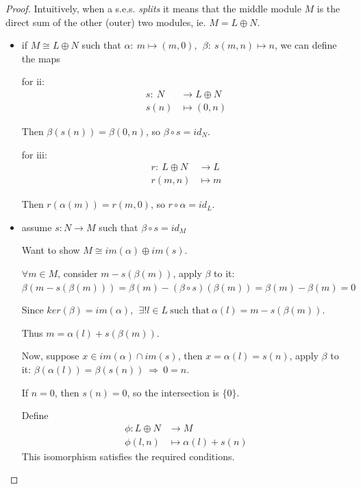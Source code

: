 \documentclass{article}
\theoremstyle{definition}
\begin{document}
\begin{proof}
  Intuitively, when a s.e.s. \emph{splits} it means that the middle module $M$ is the direct sum of the other (outer) two modules, ie. $M = L \oplus N$.

  \begin{itemize}
    \item[(i to ii, iii)]
      if $M \cong L \oplus N$ such that $\alpha:~ m \longmapsto (m,0),~~ \beta:~ s(m, n) \longmapsto n$, we can define the maps

      for ii:
      \begin{align*}
        s:~ N &\longrightarrow L \oplus N\\
        s(n) &\longmapsto (0, n)
      \end{align*}

      Then $\beta(s(n))=\beta(0,n)$, so $\beta \circ s = id_N$.

      for iii:
      \begin{align*}
        r:~ L \oplus N &\longrightarrow L\\
        r(m,n) &\longmapsto m
      \end{align*}

      Then $r(\alpha(m))=r(m,0)$, so $r \circ \alpha = id_L$.

    \item[(ii to i)]
      assume $s: N \longrightarrow M$ such that $\beta \circ s = id_M$

      Want to show $M \cong im(\alpha) \oplus im(s)$.

      $\forall m \in M$, consider $m - s(\beta(m))$, apply $\beta$ to it:\\
      $\beta(m - s(\beta(m))) = \beta(m) - (\beta \circ s)(\beta(m)) = \beta(m) - \beta(m) = 0$

      Since $ker(\beta) = im(\alpha),~~ \exists! l \in L ~\text{such that}~ \alpha(l) = m - s(\beta(m))$.

      Thus $m = \alpha(l) + s(\beta(m))$.

      \vspace{0.3cm}
      Now, suppose $x \in im(\alpha) \cap im(s)$, then $x = \alpha(l)=s(n)$, apply $\beta$ to it: $\beta(\alpha(l)) = \beta(s(n)) ~\Longrightarrow~ 0=n$.

      If $n=0$, then $s(n)=0$, so the intersection is $\{0\}$.

      \vspace{0.3cm}
      Define
      \begin{align*}
        \phi: L \oplus N &\longrightarrow M\\
        \phi(l,n) &\longmapsto \alpha(l)+s(n)
      \end{align*}
      This isomorphism satisfies the required conditions.


\end{itemize}
\end{proof}
\end{document}
